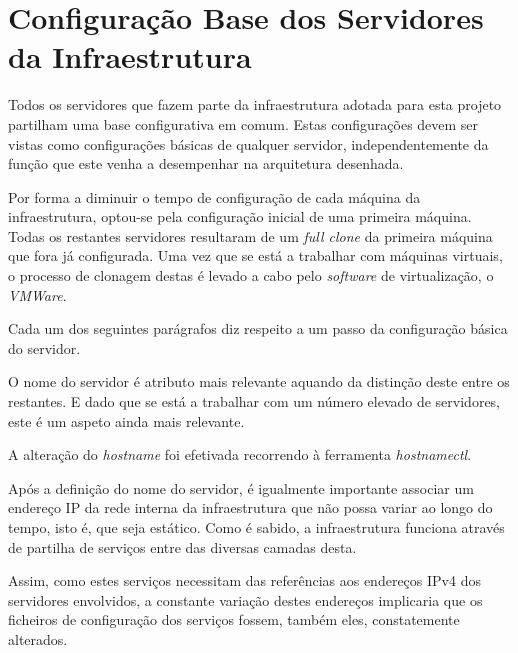 \section{Configuração Base dos Servidores da Infraestrutura}

Todos os servidores que fazem parte da infraestrutura adotada para esta projeto partilham uma base configurativa em comum.
Estas configurações devem ser vistas como configurações básicas de qualquer servidor, independentemente da função que este venha a desempenhar na arquitetura desenhada.

Por forma a diminuir o tempo de configuração de cada máquina da infraestrutura, optou-se pela configuração inicial de uma primeira máquina.
Todas os restantes servidores resultaram de um \textit{full clone} da primeira máquina que fora já configurada.
Uma vez que se está a trabalhar com máquinas virtuais, o processo de clonagem destas é levado a cabo pelo \textit{software} de virtualização, o \textit{VMWare}.

Cada um dos seguintes parágrafos diz respeito a um passo da configuração básica do servidor.


O nome do servidor é atributo mais relevante aquando da distinção deste entre os restantes.
E dado que se está a trabalhar com um número elevado de servidores, este é um aspeto ainda mais relevante.

A alteração do \textit{hostname} foi efetivada recorrendo à ferramenta \textit{hostnamectl}.

\begin{figure}[!hbt]
\end{figure}


Após a definição do nome do servidor, é igualmente importante associar um endereço IP da rede interna da infraestrutura que não possa variar ao longo do tempo, isto é, que seja estático.
Como é sabido, a infraestrutura funciona através de partilha de serviços entre das diversas camadas desta.

Assim, como estes serviços necessitam das referências aos endereços IPv4 dos servidores envolvidos, a constante variação destes endereços implicaria que os ficheiros de configuração dos serviços fossem, também eles, constatemente alterados.

